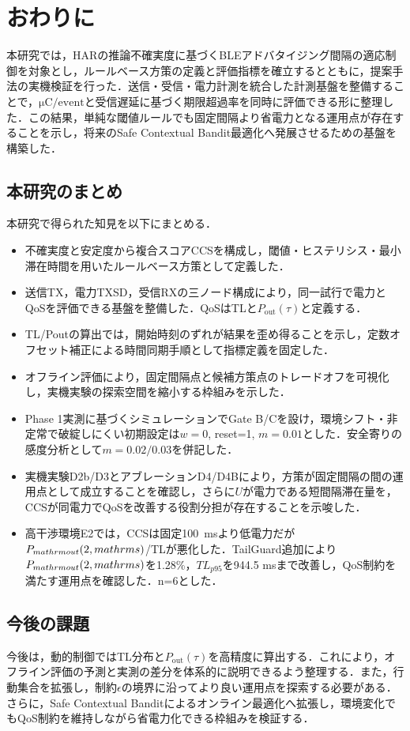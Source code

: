 \chapter{おわりに}

本研究では，HARの推論不確実度に基づくBLEアドバタイジング間隔の適応制御を対象とし，ルールベース方策の定義と評価指標を確立するとともに，提案手法の実機検証を行った．送信・受信・電力計測を統合した計測基盤を整備することで，$\si{\micro\coulomb}/\text{event}$と受信遅延に基づく期限超過率を同時に評価できる形に整理した．この結果，単純な閾値ルールでも固定間隔より省電力となる運用点が存在することを示し，将来のSafe Contextual Bandit最適化へ発展させるための基盤を構築した．

\section*{本研究のまとめ}
本研究で得られた知見を以下にまとめる．
\begin{itemize}
  \item 不確実度と安定度から複合スコアCCSを構成し，閾値・ヒステリシス・最小滞在時間を用いたルールベース方策として定義した．
  \item 送信TX，電力TXSD，受信RXの三ノード構成により，同一試行で電力とQoSを評価できる基盤を整備した．QoSはTLと$P_{\mathrm{out}}(\tau)$と定義する．
  \item TL/Poutの算出では，開始時刻のずれが結果を歪め得ることを示し，定数オフセット補正による時間同期手順として指標定義を固定した．
  \item オフライン評価により，固定間隔点と候補方策点のトレードオフを可視化し，実機実験の探索空間を縮小する枠組みを示した．
  \item Phase 1実測に基づくシミュレーションでGate B/Cを設け，環境シフト・非定常で破綻しにくい初期設定は$w=0$, reset=1, $m=0.01$とした．安全寄りの感度分析として$m=0.02/0.03$を併記した．
  \item 実機実験D2b/D3とアブレーションD4/D4Bにより，方策が固定間隔の間の運用点として成立することを確認し，さらに$U$が電力である短間隔滞在量を，CCSが同電力でQoSを改善する役割分担が存在することを示唆した．
  \item 高干渉環境E2では，CCSは固定\SI{100}{\milli\second}より低電力だが$P_{\\mathrm{out}}(2\\,\\mathrm{s})$/TLが悪化した．TailGuard追加により$P_{\\mathrm{out}}(2\\,\\mathrm{s})$を1.28\%，$TL_{p95}$を944.5 msまで改善し，QoS制約を満たす運用点を確認した．n=6とした．
\end{itemize}

\section*{今後の課題}
今後は，動的制御ではTL分布と$P_{\mathrm{out}}(\tau)$を高精度に算出する．これにより，オフライン評価の予測と実測の差分を体系的に説明できるよう整理する．また，行動集合を拡張し，制約$\epsilon$の境界に沿ってより良い運用点を探索する必要がある．さらに，Safe Contextual Banditによるオンライン最適化へ拡張し，環境変化でもQoS制約を維持しながら省電力化できる枠組みを検証する．









